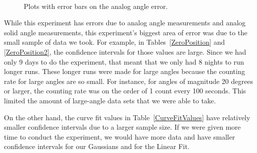 \begin{figure}[tt]
  \begin{center}
     \\
  \end{center}
  \caption{Plots with error bars on the analog angle error.}
  \label{AngleError}
\end{figure}

While this experiment has errors due to analog angle measurements and analog solid angle measurements, this experiment's biggest area of error was due to the small sample of data we took. For example, in Tables~\ref{ZeroPosition} and \ref{ZeroPosition2}, the confidence intervals for those values are large. Since we had only 9 days to do the experiment, that meant that we only had 8 nights to run longer runs. These longer runs were made for large angles because the counting rate for large angles are so small. For instance, for angles of magnitude 20 degrees or larger, the counting rate was on the order of 1 count every 100 seconds. This limited the amount of large-angle data sets that we were able to take. 

On the other hand, the curve fit values in Table~\ref{CurveFitValues} have relatively smaller confidence intervals due to a larger sample size. If we were given more time to conduct the experiment, we would have more data and have smaller confidence intervals for our Gaussians and for the Linear Fit.

